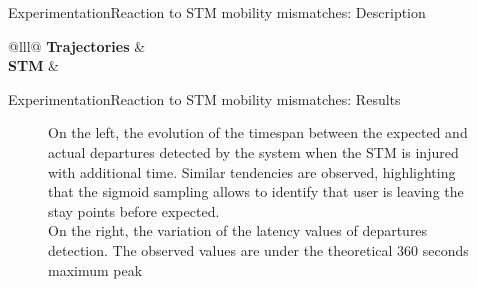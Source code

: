 \begin{frame}{Experimentation}{Reaction to STM mobility mismatches: Description}
\begin{table}
{\begin{tabular}{@{}lll@{}}
\textbf{Trajectories} &  \\

\textbf{STM} & 
\\
\bottomrule
\end{tabular}%
}
\caption{Input parameters for the reaction to mobility mismatches experiment.}
\label{tab:exp-3-input-parameters}
\end{table}
\end{frame}


\begin{frame}{Experimentation}{Reaction to STM mobility mismatches: Results}
\begin{figure}
  \centering
  \caption{On the left, the evolution of the timespan between the expected and actual departures detected by the system when the STM is injured with additional time. Similar tendencies are observed, highlighting that the sigmoid sampling allows to identify that user is leaving the stay points before expected. 
  \\ On the right, the variation of the latency values of departures detection. The observed values are under the theoretical 360 seconds maximum peak}
\end{figure}
\end{frame}


